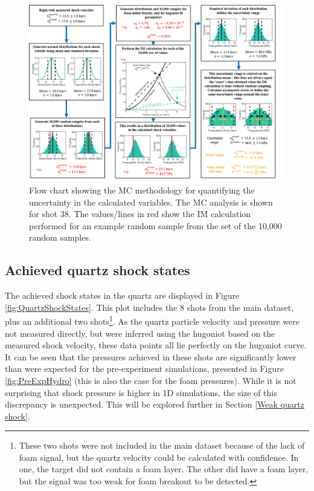 \begin{landscape}
\begin{figure} 
\begin{centering}
\includegraphics[width=1.5\textwidth]{figures/Experiment/FlowChart.png}%
\caption{\label{fig:MC Flow Chart} Flow chart showing the MC methodology for quantifying the uncertainty in the calculated variables. The MC analysis is shown for shot 38. The values/lines in red show the IM calculation performed for an example random sample from the set of the 10,000 random samples.}
\end{centering}
\end{figure}
\end{landscape}


\subsection{Achieved quartz shock states} \label{Achieved quartz shock states}

The achieved shock states in the quartz are displayed in Figure \ref{fig:QuartzShockStates}. This plot includes the 8 shots from the main dataset, plus an additional two shots\footnote{These two shots were not included in the main dataset because of the lack of foam signal, but the quartz velocity could be calculated with confidence. In one, the target did not contain a foam layer. The other did have a foam layer, but the signal was too weak for foam breakout to be detected.}. As the quartz particle velocity and pressure were not measured directly, but were inferred using the hugoniot based on the measured shock velocity, these data points all lie perfectly on the hugoniot curve. It can be seen that the pressures achieved in these shots are significantly lower than were expected for the pre-experiment simulations, presented in Figure \ref{fig:PreExpHydro} (this is also the case for the foam pressures). While it is not surprising that shock pressure is higher in 1D simulations, the size of this discrepancy is unexpected. This will be explored further in Section \ref{Weak quartz shock}.

